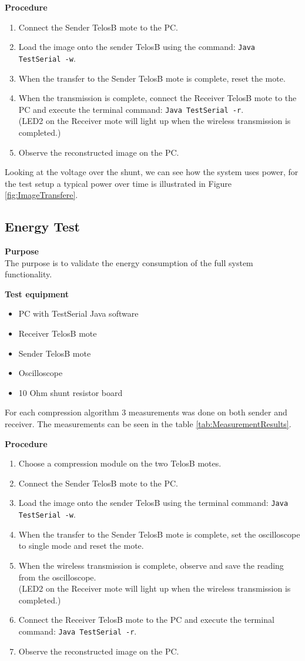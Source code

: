 \textbf{Procedure}
\begin{enumerate}
\item Connect the Sender TelosB mote to the PC.
\item Load the image onto the sender TelosB using the command: \texttt{Java TestSerial -w}.
\item When the transfer to the Sender TelosB mote is complete, reset the mote. 
\item When the transmission is complete, connect the Receiver TelosB mote to the PC and execute the terminal command: \texttt{Java TestSerial -r}. \\
(LED2 on the Receiver mote will light up when the wireless transmission is completed.)
\item Observe the reconstructed image on the PC.
\end{enumerate}

Looking at the voltage over the shunt, we can see how the system uses power, for the test setup a typical power over time is illustrated in Figure \ref{fig:ImageTransfere}.

\subsection{Energy Test}
\textbf{Purpose} \\
The purpose is to validate the energy consumption of the full system functionality.

\textbf{Test equipment}
\begin{itemize}
\item PC with TestSerial Java software
\item Receiver TelosB mote
\item Sender TelosB mote
\item Oscilloscope
\item 10 Ohm shunt resistor board
\end{itemize}
For each compression algorithm 3 measurements was done on both sender and receiver. The measurements can be seen in the table \ref{tab:MeasurementResults}.

\textbf{Procedure}
\begin{enumerate}
\item Choose a compression module on the two TelosB motes.
\item Connect the Sender TelosB mote to the PC.
\item Load the image onto the sender TelosB using the terminal command: \texttt{Java TestSerial -w}.
\item When the transfer to the Sender TelosB mote is complete, set the oscilloscope to single mode and reset the mote.
\item When the wireless transmission is complete, observe and save the reading from the oscilloscope. \\
(LED2 on the Receiver mote will light up when the wireless transmission is completed.)
\item Connect the Receiver TelosB mote to the PC and execute the terminal command: \texttt{Java TestSerial -r}.
\item Observe the reconstructed image on the PC.
\end{enumerate}

